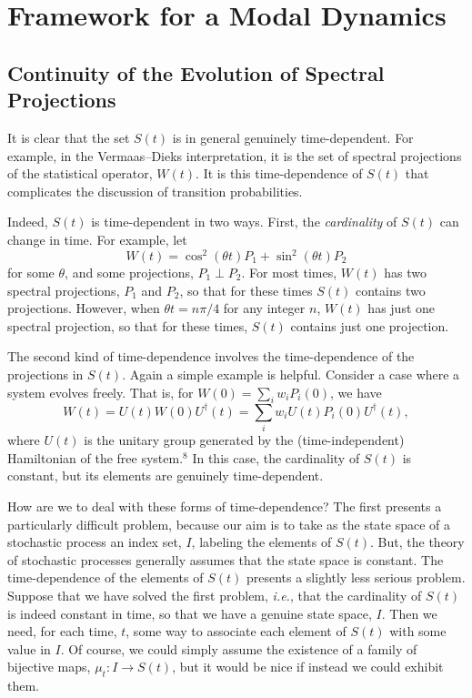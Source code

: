 \documentclass[12pt]{article}
\newcommand{\be}{\begin{equation}}
\newcommand{\ee}{\end{equation}}
\newcommand{\ie}{{\it i.e.}}         %
\begin{document}
\section{Framework for a Modal Dynamics}

\subsection{Continuity of the Evolution of Spectral Projections}


It is clear that the set $S(t)$ is in general genuinely
time-dependent.  For example, in the Vermaas--Dieks interpretation, it
is the set of spectral projections of the statistical operator,
$W(t)$.  It is this time-dependence of $S(t)$ that complicates the
discussion of transition probabilities.

Indeed, $S(t)$ is time-dependent in two ways.  First, the {\it
cardinality} of $S(t)$ can change in time. For example, let
\be
\label{eq:easyexample}
W(t) = \cos^{2}(\theta t) P_{1} + \sin^{2}(\theta t) P_{2}
\ee
\noindent for some $\theta$, and some projections, $P_{1} \perp P_{2}$.
For most times, $W(t)$ has two spectral projections, $P_{1}$ and $P_{2}$,
so that for these times $S(t)$ contains two projections.  However,
when $\theta t = n\pi/4$ for any integer $n$, $W(t)$ has just one
spectral projection, so that for these times, $S(t)$ contains just one
projection.

The second kind of time-dependence involves the time-dependence of the
projections in $S(t)$.  Again a simple example is helpful.  Consider a
case where a system evolves freely.  That is, for $W(0) = \sum_i w_i P_i(0)$, 
we have
\be
W(t) = U(t) W(0) U^{\dagger}(t) = \sum_i w_i U(t) P_i(0) U^{\dagger}(t),
\ee
where $U(t)$ is the unitary group generated by the (time-independent)
Hamiltonian of the free system.$^8$ In this case, the cardinality of $S(t)$ 
is constant, but its elements are genuinely time-dependent.

How are we to deal with these forms of time-dependence?  The first
presents a particularly difficult problem, because our aim is to take
as the state space of a stochastic process an index set, $I$, labeling
the elements of $S(t)$.  But, the theory of stochastic processes
generally assumes that the state space is constant.  The
time-dependence of the elements of $S(t)$ presents a slightly less
serious problem.  Suppose that we have solved the first problem, \ie,
that the cardinality of $S(t)$ is indeed constant in time, so that we
have a genuine state space, $I$.  Then we need, for each time, $t$,
some way to associate each element of $S(t)$ with some value in $I$.
Of course, we could simply assume the existence of a family of
bijective maps, $\mu_{t}:I \rightarrow S(t)$, but it would be nice if
instead we could exhibit them.
\end{document}
